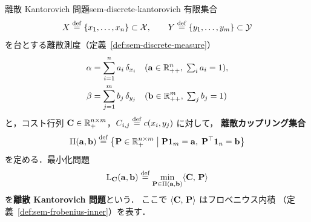 \begin{definition}{離散 Kantorovich 問題}{sem-discrete-kantorovich}
  有限集合
  \[
    X \overset{\mathrm{def}}{=} \{x_1, \ldots, x_n\} \subset \mathcal{X}, \qquad
    Y \overset{\mathrm{def}}{=} \{y_1, \ldots, y_m\} \subset \mathcal{Y}
  \]
  を台とする離散測度（定義~\ref{def:sem-discrete-measure}）
  \begin{align*}
    \alpha &= \sum_{i=1}^n a_i\, \delta_{x_i}
      \quad (\mathbf{a} \in \mathbb{R}_{++}^n,\; \textstyle\sum_i a_i = 1), \\
    \beta  &= \sum_{j=1}^m b_j\, \delta_{y_j}
      \quad (\mathbf{b} \in \mathbb{R}_{++}^m,\; \textstyle\sum_j b_j = 1)
  \end{align*}
  と，コスト行列 $\mathbf{C} \in \mathbb{R}_+^{n \times m}$，$C_{i,j} \overset{\mathrm{def}}{=} c(x_i, y_j)$ に対して，
  \textbf{離散カップリング集合}
  \[
    \Pi(\mathbf{a}, \mathbf{b}) \overset{\mathrm{def}}{=}
    \left\{ \mathbf{P} \in \mathbb{R}_+^{n \times m} \;\middle|\;
    \mathbf{P} \mathbf{1}_m = \mathbf{a},\;
    \mathbf{P}^\top \mathbf{1}_n = \mathbf{b} \right\}
  \]
  を定める．最小化問題
  \[
    \mathrm{L}_{\mathbf{C}}(\mathbf{a}, \mathbf{b})
    \overset{\mathrm{def}}{=}
    \min_{\mathbf{P} \in \Pi(\mathbf{a}, \mathbf{b})}
    \langle \mathbf{C},\, \mathbf{P} \rangle
  \]
  を\textbf{離散 Kantorovich 問題}という．
  ここで $\langle \mathbf{C},\, \mathbf{P} \rangle$ はフロベニウス内積
  （定義~\ref{def:sem-frobenius-inner}）を表す．
\end{definition}

